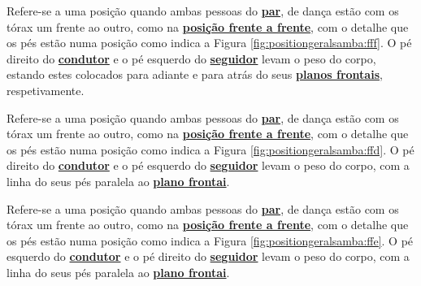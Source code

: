 \begin{definition}
\label{def:fff-position}  
Refere-se a uma posição quando ambas pessoas do \hyperref[def:Par]{\textbf{par}}, 
de dança estão com os tórax um frente ao outro, 
como na \hyperref[def:frente-frente-position]{\textbf{posição frente a frente}},
com o detalhe que os pés estão numa posição como indica a Figura \ref{fig:positiongeralsamba:fff}.
O pé direito do \hyperref[def:Condutor]{\textbf{condutor}} e 
o pé esquerdo do \hyperref[def:Seguidor]{\textbf{seguidor}} levam o peso do corpo,
estando estes colocados para adiante e para atrás do seus \hyperref[def:PlanoFrontal]{\textbf{planos frontais}}, 
respetivamente.
\end{definition}

\begin{definition}
\label{def:ffd-position}  
Refere-se a uma posição quando ambas pessoas do \hyperref[def:Par]{\textbf{par}}, 
de dança estão com os tórax um frente ao outro, 
como na \hyperref[def:frente-frente-position]{\textbf{posição frente a frente}},
com o detalhe que os pés estão numa posição como indica a Figura \ref{fig:positiongeralsamba:ffd}.
O pé direito do \hyperref[def:Condutor]{\textbf{condutor}} e 
o pé esquerdo do \hyperref[def:Seguidor]{\textbf{seguidor}} levam o peso do corpo,
com a linha do seus pés paralela ao \hyperref[def:PlanoFrontal]{\textbf{plano frontai}}.
\end{definition}


\begin{definition}
\label{def:ffe-position}  
Refere-se a uma posição quando ambas pessoas do \hyperref[def:Par]{\textbf{par}}, 
de dança estão com os tórax um frente ao outro, 
como na \hyperref[def:frente-frente-position]{\textbf{posição frente a frente}},
com o detalhe que os pés estão numa posição como indica a Figura \ref{fig:positiongeralsamba:ffe}.
O pé esquerdo do \hyperref[def:Condutor]{\textbf{condutor}} e 
o pé direito do \hyperref[def:Seguidor]{\textbf{seguidor}} levam o peso do corpo,
com a linha do seus pés paralela ao \hyperref[def:PlanoFrontal]{\textbf{plano frontai}}.
\end{definition}


